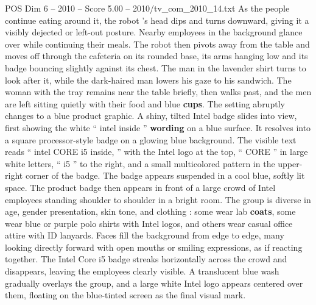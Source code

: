 \begin{textsample}{POS Dim 6 – 2010 – Score 5.00 – 2010/tv\_com\_2010\_14.txt}
As the people continue eating around it, the robot ’s head dips and turns downward, giving it a visibly dejected or left-out posture.
Nearby employees in the background glance over while continuing their meals.
The robot then pivots away from the table and moves off through the cafeteria on its rounded base, its arms hanging low and its badge bouncing slightly against its chest.
The man in the lavender shirt turns to look after it, while the dark-haired man lowers his gaze to his sandwich.
The woman with the tray remains near the table briefly, then walks past, and the men are left sitting quietly with their food and blue \textbf{cups}.
The setting abruptly changes to a blue product graphic.
A shiny, tilted Intel badge slides into view, first showing the white “ intel inside ” \textbf{wording} on a blue surface.
It resolves into a square processor-style badge on a glowing blue background.
The visible text reads “ intel CORE i5 inside, ” with the Intel logo at the top, “ CORE ” in large white letters, “ i5 ” to the right, and a small multicolored pattern in the upper-right corner of the badge.
The badge appears suspended in a cool blue, softly lit space.
The product badge then appears in front of a large crowd of Intel employees standing shoulder to shoulder in a bright room.
The group is diverse in age, gender presentation, skin tone, and clothing : some wear lab \textbf{coats}, some wear blue or purple polo shirts with Intel logos, and others wear casual office attire with ID lanyards.
Faces fill the background from edge to edge, many looking directly forward with open mouths or smiling expressions, as if reacting together.
The Intel Core i5 badge streaks horizontally across the crowd and disappears, leaving the employees clearly visible.
A translucent blue wash gradually overlays the group, and a large white Intel logo appears centered over them, floating on the blue-tinted screen as the final visual mark.

\end{textsample}
